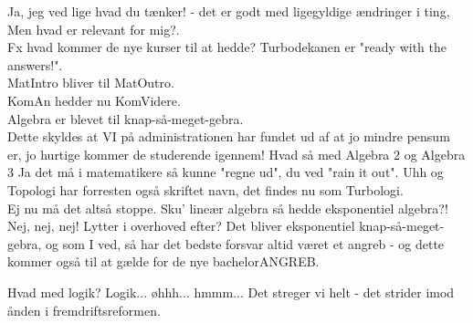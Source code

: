 \documentclass[a4paper,11pt]{article}
\begin{document}
\begin{sketch}
  Ja, jeg ved lige hvad du tænker! - det er godt med ligegyldige ændringer i ting, Men hvad er relevant for mig?.\\
Fx hvad kommer de nye kurser til at hedde?
Turbodekanen er "ready with the answers!". \\
MatIntro bliver til MatOutro. \\
KomAn hedder nu KomVidere.  \\
Algebra er blevet til knap-så-meget-gebra. \\
Dette skyldes at VI på administrationen har fundet ud af at jo mindre pensum er, jo hurtige kommer de studerende igennem!
 Hvad så med Algebra 2 og Algebra 3
 Ja det må i matematikere så kunne "regne ud", du ved "rain it out". Uhh og Topologi har forresten også skriftet navn, det findes nu som Turbologi. \\
 Ej nu må det altså stoppe. Sku’ lineær algebra så hedde eksponentiel algebra?!
 Nej, nej, nej! Lytter i overhoved efter?  Det bliver eksponentiel knap-så-meget-gebra, og som I ved, så har det bedste forsvar altid været et angreb - og dette kommer også til at gælde for de nye bachelorANGREB.

 Hvad med logik?
  Logik... øhhh... hmmm... Det streger vi helt - det strider imod ånden i fremdriftsreformen.
\end{sketch}
\end{document}
